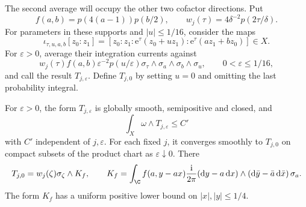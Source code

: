 The second average will occupy the other two cofactor directions. Put
\[
 f(a,b)=p(4(a-1))p(b/2),\qquad
 w_j(\tau)=4\delta^{-2}p(2\tau/\delta).
\]
For parameters in these supports and $|u|\leq1/16$, consider the maps
\begin{equation}\label{eq:lower-mass-rational-curves}
 \iota_{\tau,u,a,b}[z_0:z_1]
 =[z_0:z_1:\mathrm{e}^{\tau}(z_0+uz_1):
                \mathrm{e}^{\tau}(az_1+bz_0)]\in X.
\end{equation}
For $\varepsilon>0$, average their integration currents against
\[
 w_j(\tau)f(a,b)\varepsilon^{-2}p(u/\varepsilon)
       \sigma_\tau\wedge\sigma_a\wedge\sigma_b\wedge\sigma_u,
 \qquad 0<\varepsilon\leq1/16,
\]
and call the result $T_{j,\varepsilon}$. Define $T_{j,0}$ by setting $u=0$ and omitting the last probability integral.

\begin{lemma}\label{lem:lower-mass-curve-average}
For $\varepsilon>0$, the form $T_{j,\varepsilon}$ is globally smooth, semipositive and closed, and
\[
 \int_X\omega\wedge T_{j,\varepsilon}\leq C'
\]
with $C'$ independent of $j,\varepsilon$. For each fixed $j$, it converges smoothly to $T_{j,0}$ on compact subsets of the product chart as $\varepsilon\downarrow0$. There
\begin{equation}\label{eq:lower-mass-curve-local}
 T_{j,0}=w_j(\zeta)\sigma_\zeta\wedge K_f,\qquad
 K_f=\int_\C f(a,y-ax)\frac{\mathrm{i}}{2\pi}
       (\mathrm{d}y-a\,\mathrm{d}x)\wedge
       (\mathrm{d}\bar y-\bar a\,\mathrm{d}\bar x)\,\sigma_a.
\end{equation}
The form $K_f$ has a uniform positive lower bound on $|x|,|y|\leq1/4$.
\end{lemma}
